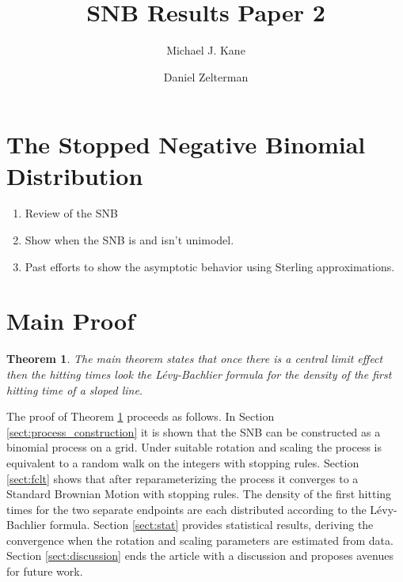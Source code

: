 \documentclass{article}
\newtheorem{thm}{Theorem}
\begin{document}
\title{SNB Results Paper 2}

\author{Michael J. Kane}
\author{Daniel Zelterman}


\maketitle


\section{The Stopped Negative Binomial Distribution} \label{sect:intro}

\begin{enumerate}
\item Review of the SNB
\item Show when the SNB is and isn't unimodel.
\item Past efforts to show the asymptotic behavior using Sterling 
approximations.
\end{enumerate}

\section{Main Proof}

\begin{thm} \label{thm:main}
The main theorem states that once there is a central limit effect 
then the hitting times look the L\'{e}vy-Bachlier formula for the density 
of the first hitting time of a sloped line.
\end{thm}

The proof of Theorem \ref{thm:main} proceeds as follows. In Section
\ref{sect:process_construction} it is shown that the SNB can be 
constructed as a binomial process on a grid. Under suitable 
rotation and scaling the process is equivalent to a random walk 
on the integers with stopping rules. Section \ref{sect:fclt} shows that
after reparameterizing the process it converges to a Standard Brownian
Motion with stopping rules. The density of the first hitting times for
the two separate endpoints are each distributed according to the 
L\'{e}vy-Bachlier formula. Section \ref{sect:stat} provides statistical 
results, deriving the convergence when the rotation and scaling parameters
are estimated from data. Section \ref{sect:discussion} ends the article
with a discussion and proposes avenues for future work.
\end{document}
